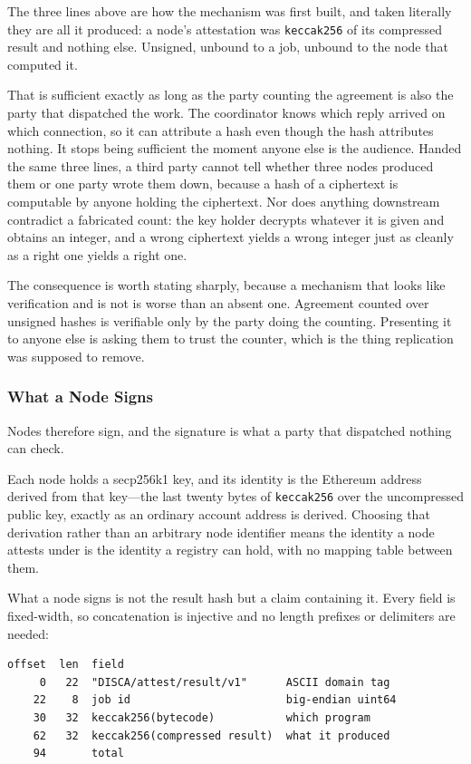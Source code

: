 \documentclass[12pt,a4paper]{article}
\begin{document}
The three lines above are how the mechanism was first built, and taken literally they are all it produced: a node's attestation was \texttt{keccak256} of its compressed result and nothing else.
Unsigned, unbound to a job, unbound to the node that computed it.

That is sufficient exactly as long as the party counting the agreement is also the party that dispatched the work.
The coordinator knows which reply arrived on which connection, so it can attribute a hash even though the hash attributes nothing.
It stops being sufficient the moment anyone else is the audience.
Handed the same three lines, a third party cannot tell whether three nodes produced them or one party wrote them down, because a hash of a ciphertext is computable by anyone holding the ciphertext.
Nor does anything downstream contradict a fabricated count: the key holder decrypts whatever it is given and obtains an integer, and a wrong ciphertext yields a wrong integer just as cleanly as a right one yields a right one.

The consequence is worth stating sharply, because a mechanism that looks like verification and is not is worse than an absent one.
Agreement counted over unsigned hashes is verifiable only by the party doing the counting.
Presenting it to anyone else is asking them to trust the counter, which is the thing replication was supposed to remove.

\subsubsection{What a Node Signs}

Nodes therefore sign, and the signature is what a party that dispatched nothing can check.

Each node holds a secp256k1 key, and its identity is the Ethereum address derived from that key---the last twenty bytes of \texttt{keccak256} over the uncompressed public key, exactly as an ordinary account address is derived.
Choosing that derivation rather than an arbitrary node identifier means the identity a node attests under is the identity a registry can hold, with no mapping table between them.

What a node signs is not the result hash but a claim containing it.
Every field is fixed-width, so concatenation is injective and no length prefixes or delimiters are needed:

\begin{verbatim}
offset  len  field
     0   22  "DISCA/attest/result/v1"      ASCII domain tag
    22    8  job id                        big-endian uint64
    30   32  keccak256(bytecode)           which program
    62   32  keccak256(compressed result)  what it produced
    94       total
\end{verbatim}
\end{document}
